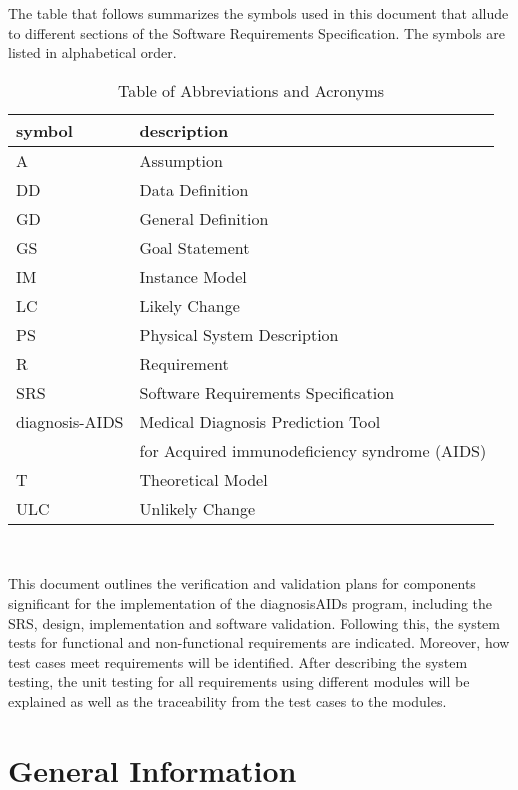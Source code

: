 \documentclass[12pt, titlepage]{article}
\begin{document}
The table that follows summarizes the symbols used in this document that allude 
to different sections of the Software Requirements Specification. The symbols 
are listed in alphabetical order.
\begin{table}[ht]
\begin{center}
\renewcommand{\arraystretch}{1.2}
\begin{tabular}{l l} 
  \toprule		
  \textbf{symbol} & \textbf{description}\\
  \midrule 
  A & Assumption\\
  DD & Data Definition\\
  GD & General Definition\\
  GS & Goal Statement\\
  IM & Instance Model\\
  LC & Likely Change\\
  PS & Physical System Description\\
  R & Requirement\\
  SRS & Software Requirements Specification\\
  diagnosis-AIDS & Medical Diagnosis Prediction Tool \\
   & for Acquired immunodeficiency syndrome (AIDS)\\
  T & Theoretical Model\\
  ULC & Unlikely Change\\
  \bottomrule
\end{tabular}\\
\end{center}
\caption{Table of Abbreviations and Acronyms}

\end{table}

\newpage


This document outlines the verification and validation plans for components 
significant for the implementation of the diagnosisAIDs program, including the 
SRS, design, implementation and software validation. Following this, the system 
tests for functional and non-functional requirements are indicated. Moreover, 
how test cases meet requirements will be identified. After describing the system 
testing, the unit testing for all requirements using different modules will be 
explained as well as the traceability from the test cases to the modules.

\section{General Information}
\end{document}
